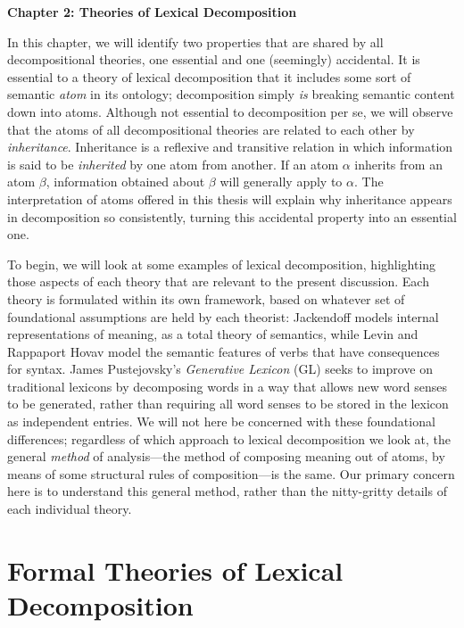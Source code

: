 \begin{center}
\Large \textbf{Chapter 2: Theories of Lexical Decomposition} \\[1ex]
\end{center} 
 \setcounter{section}{0}
In this chapter, we will identify two properties that are shared by all decompositional theories, one essential and one (seemingly) accidental. It is essential to a theory of lexical decomposition that it includes some sort of semantic \emph{atom} in its ontology; decomposition simply \emph{is} breaking semantic content down into atoms. Although not essential to decomposition per se, we will observe that the atoms of all decompositional theories are related to each other by \emph{inheritance}. Inheritance is a reflexive and transitive relation in which information is said to be \emph{inherited} by one atom from another. If an atom $\alpha$ inherits from an atom $\beta$, information obtained about $\beta$ will generally apply to $\alpha$. The interpretation of atoms offered in this thesis will explain why inheritance appears in decomposition so consistently, turning this accidental property into an essential one.

To begin, we will look at some examples of lexical decomposition, highlighting those aspects of each theory that are relevant to the present discussion. Each theory is formulated within its own framework, based on whatever set of foundational assumptions are held by each theorist: Jackendoff models internal representations of meaning, as a total theory of semantics, while Levin and Rappaport Hovav model the semantic features of verbs that have consequences for syntax. James Pustejovsky's \emph{Generative Lexicon} (GL) seeks to improve on traditional lexicons by decomposing words in a way that allows new word senses to be generated, rather than requiring all word senses to be stored in the lexicon as independent entries. We will not here be concerned with these foundational differences; regardless of which approach to lexical decomposition we look at, the general \emph{method} of analysis---the method of composing meaning out of atoms, by means of some structural rules of composition---is the same. Our primary concern here is to understand this general method, rather than the nitty-gritty details of each individual theory.

\section{Formal Theories of Lexical Decomposition}\label{sec2.1}

